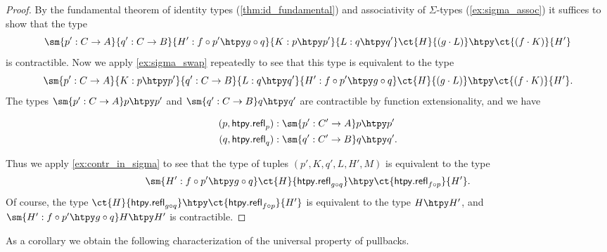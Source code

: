 \begin{proof}
By the fundamental theorem of identity types (\cref{thm:id_fundamental}) and associativity of $\Sigma$-types (\cref{ex:sigma_assoc}) it suffices to show that the type
\begin{equation*}
\sm{p':C\to A}{q':C\to B}{H':f\circ p'\htpy g\circ q}{K:p\htpy p'}{L:q\htpy q'} \ct{H}{(g\cdot L)} \htpy \ct{(f\cdot K)}{H'}
\end{equation*}
is contractible. Now we apply \cref{ex:sigma_swap} repeatedly to see that this type is equivalent to the type
\begin{equation*}
\sm{p':C\to A}{K: p\htpy p'}{q':C\to B}{L: q\htpy q'}{H':f\circ p'\htpy g\circ q} \ct{H}{(g\cdot L)} \htpy \ct{(f\cdot K)}{H'}.
\end{equation*}
The types $\sm{p':C\to A} p\htpy p'$ and $\sm{q':C\to B} q\htpy q'$ are contractible by function extensionality, and  we have
\begin{samepage}
\begin{align*}
(p,\mathsf{htpy.refl}_p) & : \sm{p':C'\to A} p\htpy p' \\
(q,\mathsf{htpy.refl}_q) & : \sm{q':C'\to B} q\htpy q'.
\end{align*}%
\end{samepage}%
Thus we apply \cref{ex:contr_in_sigma} to see that the type of tuples $(p',K,q',L,H',M)$ is equivalent to the type
\begin{equation*}
\sm{H':f\circ p'\htpy g\circ q} \ct{H}{\mathsf{htpy.refl}_{g\circ q}}\htpy \ct{\mathsf{htpy.refl}_{f\circ p}}{H'}.
\end{equation*}
Of course, the type $\ct{H}{\mathsf{htpy.refl}_{g\circ q}}\htpy \ct{\mathsf{htpy.refl}_{f\circ p}}{H'}$ is equivalent to the type $H\htpy H'$, and $\sm{H':f\circ p'\htpy g\circ q} H\htpy H'$ is contractible.
\end{proof}

As a corollary we obtain the following characterization of the universal property of pullbacks.

